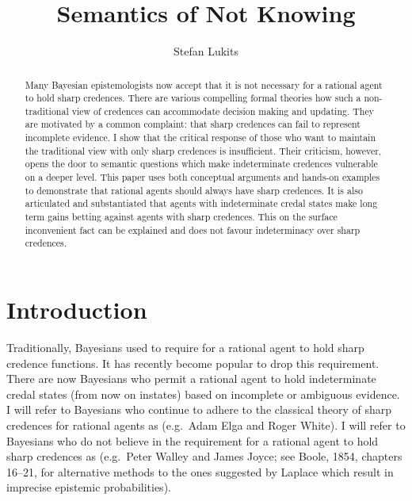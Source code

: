 \documentclass[11pt]{article}
\begin{document}

\title{Semantics of Not Knowing}
\author{Stefan Lukits}
\date{}
\maketitle
{}

\begin{abstract}
  {\noindent}Many Bayesian epistemologists now accept that it is not necessary for a rational agent to hold sharp credences. There are various compelling formal theories how such a non-traditional view of credences can accommodate decision making and updating. They are motivated by a common complaint: that sharp credences can fail to represent incomplete evidence. I show that the critical response of those who want to maintain the traditional view with only sharp credences is insufficient. Their criticism, however, opens the door to semantic questions which make indeterminate credences vulnerable on a deeper level. This paper uses both conceptual arguments and hands-on examples to demonstrate that rational agents should always have sharp credences. It is also articulated and substantiated that agents with indeterminate credal states make long term gains betting against agents with sharp credences. This on the surface inconvenient fact can be explained and does not favour indeterminacy over sharp credences.
\end{abstract}

\section{Introduction}
\label{Introduction}

Traditionally, Bayesians used to require for a rational agent to hold sharp credence functions. It has recently become popular to drop this requirement. There are now Bayesians who permit a rational agent to hold indeterminate credal states (from now on instates) based on incomplete or ambiguous evidence. I will refer to Bayesians who continue to adhere to the classical theory of sharp credences for rational agents as  (e.g.\ Adam Elga and Roger White). I will refer to Bayesians who do not believe in the requirement for a rational agent to hold sharp credences as  (e.g.\ Peter Walley and James Joyce; see Boole, 1854, chapters 16--21, for alternative methods to the ones suggested by Laplace which result in imprecise epistemic probabilities).
\end{document}
